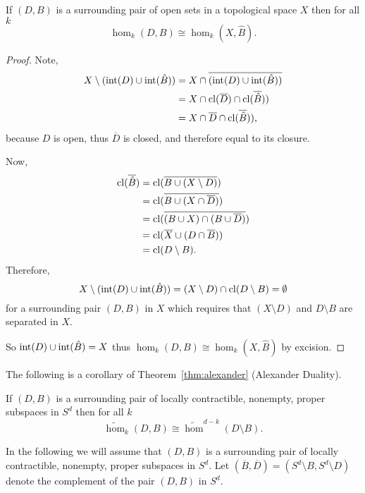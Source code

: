 \begin{lemma}\label{lem:extension_iso}
  If $(D, B)$ is a surrounding pair of open sets in a topological space $X$ then for all $k$
  \[ \hom_k(D, B)\cong \hom_k(X, \hat{B}).\]
\end{lemma}
\begin{proof}
  Note,
  \begin{align*}
    X\setminus (\mathrm{int}(D)\cup\mathrm{int}(\hat{B})) &= X\cap \overline{(\mathrm{int}(D)\cup\mathrm{int}(\hat{B}))}\\
      &= X\cap \mathrm{cl}(\overline{D})\cap\mathrm{cl}(\overline{\hat{B}})) \\
      &= X\cap \overline{D}\cap\mathrm{cl}(\overline{\hat{B}})),
  \end{align*}
  because $D$ is open, thus $\overline{D}$ is closed, and therefore equal to its closure.

  Now,
  \begin{align*}
    \mathrm{cl}(\overline{\hat{B}}) &= \mathrm{cl}(\overline{B\cup (X\setminus D)})\\
      &= \mathrm{cl}(\overline{B\cup (X\cap \overline{D})})\\
      &= \mathrm{cl}(\overline{(B\cup X)\cap (B\cup\overline{D})})\\
      &= \mathrm{cl}(\overline{X}\cup (D\cap\overline{B}))\\
      &= \mathrm{cl}(D\setminus B).
  \end{align*}
  Therefore,
  \[ X\setminus (\mathrm{int}(D)\cup\mathrm{int}(\hat{B})) = (X\setminus D)\cap \mathrm{cl}(D\setminus B) =\emptyset \]
  for a surrounding pair $(D, B)$ in $X$ which requires that $(X\setminus D)$ and $D\setminus B$ are separated in $X$.

  So $\mathrm{int}(D)\cup\mathrm{int}(\hat{B}) = X$ thus $\hom_k(D, B)\cong \hom_k(X, \hat{B})$ by excision.
\end{proof}

The following is a corollary of Theorem~\ref{thm:alexander} (Alexander Duality).

\begin{corollary}\label{cor:alexander_surrounds}
  If $(D,B)$ is a surrounding pair of locally contractible, nonempty, proper subspaces in $S^d$ then for all $k$
  \[ \tilde{\hom}_k(D, B) \cong \tilde{\hom}^{d-k}(D\setminus B). \]
\end{corollary}

In the following we will assume that $(D,B)$ is a surrounding pair of locally contractible, nonempty, proper subspaces in $S^d$.
Let $(\overline{B}, \overline{D}) = (S^d\setminus B, S^d\setminus D)$ denote the complement of the pair $(D, B)$ in $S^d$.

